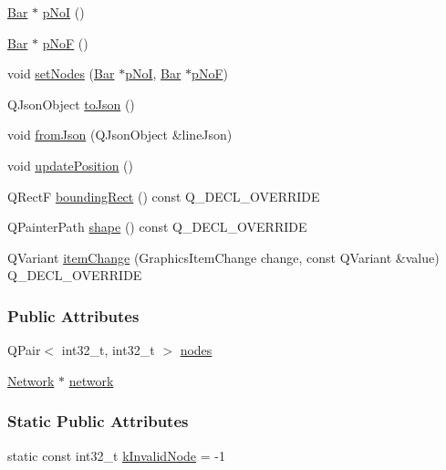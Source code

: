 \begin{DoxyCompactItemize}
\item 
\hyperlink{class_bar}{Bar} $\ast$ \hyperlink{group___models_gaeafd90e84ac2f8de2a879abe9e53eef3}{p\+No\+I} ()
\item 
\hyperlink{class_bar}{Bar} $\ast$ \hyperlink{group___models_gabbc73ddedd3075c33ae5331bd7c9829f}{p\+No\+F} ()
\item 
void \hyperlink{group___models_gaeeab146e6c1d7d1a688a2764a9c9a170}{set\+Nodes} (\hyperlink{class_bar}{Bar} $\ast$\hyperlink{group___models_gaeafd90e84ac2f8de2a879abe9e53eef3}{p\+No\+I}, \hyperlink{class_bar}{Bar} $\ast$\hyperlink{group___models_gabbc73ddedd3075c33ae5331bd7c9829f}{p\+No\+F})
\item 
Q\+Json\+Object \hyperlink{group___models_ga4effa7a96db465ea6e01135d5a010739}{to\+Json} ()
\item 
void \hyperlink{group___models_ga62623ad71df5279377cc69da90decc75}{from\+Json} (Q\+Json\+Object \&line\+Json)
\item 
void \hyperlink{group___models_ga8fdb12651d4bc592616d241386b066b3}{update\+Position} ()
\item 
Q\+Rect\+F \hyperlink{group___models_gad15c3af158d3b966c04be7e18cee5aea}{bounding\+Rect} () const Q\+\_\+\+D\+E\+C\+L\+\_\+\+O\+V\+E\+R\+R\+I\+D\+E
\item 
Q\+Painter\+Path \hyperlink{group___models_gaf1736b829a643d99052ef6428ddd5b16}{shape} () const Q\+\_\+\+D\+E\+C\+L\+\_\+\+O\+V\+E\+R\+R\+I\+D\+E
\item 
Q\+Variant \hyperlink{group___models_ga5fcee3f23eb50e34f730d602a3802b93}{item\+Change} (Graphics\+Item\+Change change, const Q\+Variant \&value) Q\+\_\+\+D\+E\+C\+L\+\_\+\+O\+V\+E\+R\+R\+I\+D\+E
\end{DoxyCompactItemize}
\subsubsection*{Public Attributes}
\begin{DoxyCompactItemize}
\item 
Q\+Pair$<$ int32\+\_\+t, int32\+\_\+t $>$ \hyperlink{class_line_afd17c40d656e6a8d677cb22df5f0c70b}{nodes}
\item 
\hyperlink{class_network}{Network} $\ast$ \hyperlink{class_line_aefdf6a6c3e3775b5a16b344c1d33964e}{network}
\end{DoxyCompactItemize}
\subsubsection*{Static Public Attributes}
\begin{DoxyCompactItemize}
\item 
static const int32\+\_\+t \hyperlink{group___models_gadc334bd07c6126abc56e531d7e3e72b4}{k\+Invalid\+Node} = -\/1
\end{DoxyCompactItemize}
